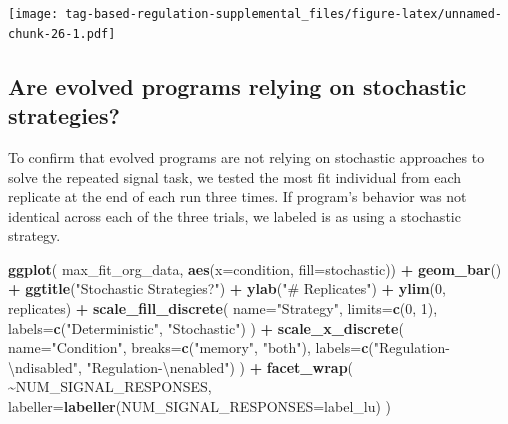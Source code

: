 \documentclass[
]{book}
\newenvironment{Shaded}{\begin{snugshade}}{\end{snugshade}}
\newcommand{\CharTok}[1]{\textcolor[rgb]{0.31,0.60,0.02}{#1}}
\newcommand{\DataTypeTok}[1]{\textcolor[rgb]{0.13,0.29,0.53}{#1}}
\newcommand{\DecValTok}[1]{\textcolor[rgb]{0.00,0.00,0.81}{#1}}
\newcommand{\KeywordTok}[1]{\textcolor[rgb]{0.13,0.29,0.53}{\textbf{#1}}}
\newcommand{\NormalTok}[1]{#1}
\newcommand{\OperatorTok}[1]{\textcolor[rgb]{0.81,0.36,0.00}{\textbf{#1}}}
\newcommand{\StringTok}[1]{\textcolor[rgb]{0.31,0.60,0.02}{#1}}
\begin{document}
\texttt{[image: tag-based-regulation-supplemental\_files/figure-latex/unnamed-chunk-26-1.pdf]}

\hypertarget{are-evolved-programs-relying-on-stochastic-strategies}{%
\subsection{Are evolved programs relying on stochastic strategies?}\label{are-evolved-programs-relying-on-stochastic-strategies}}

To confirm that evolved programs are not relying on stochastic approaches to solve the repeated signal task,
we tested the most fit individual from each replicate at the end of each run three times.
If program's behavior was not identical across each of the three trials, we labeled is as using a stochastic strategy.

\begin{Shaded}
\begin{Highlighting}[]
\KeywordTok{ggplot}\NormalTok{( max\_fit\_org\_data, }\KeywordTok{aes}\NormalTok{(}\DataTypeTok{x=}\NormalTok{condition, }\DataTypeTok{fill=}\NormalTok{stochastic)) }\OperatorTok{+}
\StringTok{  }\KeywordTok{geom\_bar}\NormalTok{() }\OperatorTok{+}
\StringTok{  }\KeywordTok{ggtitle}\NormalTok{(}\StringTok{"Stochastic Strategies?"}\NormalTok{) }\OperatorTok{+}
\StringTok{  }\KeywordTok{ylab}\NormalTok{(}\StringTok{"\# Replicates"}\NormalTok{) }\OperatorTok{+}
\StringTok{  }\KeywordTok{ylim}\NormalTok{(}\DecValTok{0}\NormalTok{, replicates) }\OperatorTok{+}
\StringTok{  }\KeywordTok{scale\_fill\_discrete}\NormalTok{(}
    \DataTypeTok{name=}\StringTok{"Strategy"}\NormalTok{,}
    \DataTypeTok{limits=}\KeywordTok{c}\NormalTok{(}\DecValTok{0}\NormalTok{, }\DecValTok{1}\NormalTok{),}
    \DataTypeTok{labels=}\KeywordTok{c}\NormalTok{(}\StringTok{"Deterministic"}\NormalTok{, }\StringTok{"Stochastic"}\NormalTok{)}
\NormalTok{  ) }\OperatorTok{+}
\StringTok{  }\KeywordTok{scale\_x\_discrete}\NormalTok{(}
    \DataTypeTok{name=}\StringTok{"Condition"}\NormalTok{,}
    \DataTypeTok{breaks=}\KeywordTok{c}\NormalTok{(}\StringTok{"memory"}\NormalTok{, }\StringTok{"both"}\NormalTok{),}
    \DataTypeTok{labels=}\KeywordTok{c}\NormalTok{(}\StringTok{"Regulation{-}}\CharTok{\textbackslash{}n}\StringTok{disabled"}\NormalTok{, }\StringTok{"Regulation{-}}\CharTok{\textbackslash{}n}\StringTok{enabled"}\NormalTok{)}
\NormalTok{  ) }\OperatorTok{+}
\StringTok{  }\KeywordTok{facet\_wrap}\NormalTok{(}
    \OperatorTok{\textasciitilde{}}\NormalTok{NUM\_SIGNAL\_RESPONSES,}
    \DataTypeTok{labeller=}\KeywordTok{labeller}\NormalTok{(}\DataTypeTok{NUM\_SIGNAL\_RESPONSES=}\NormalTok{label\_lu)}
\NormalTok{  )}
\end{Highlighting}
\end{Shaded}
\end{document}
